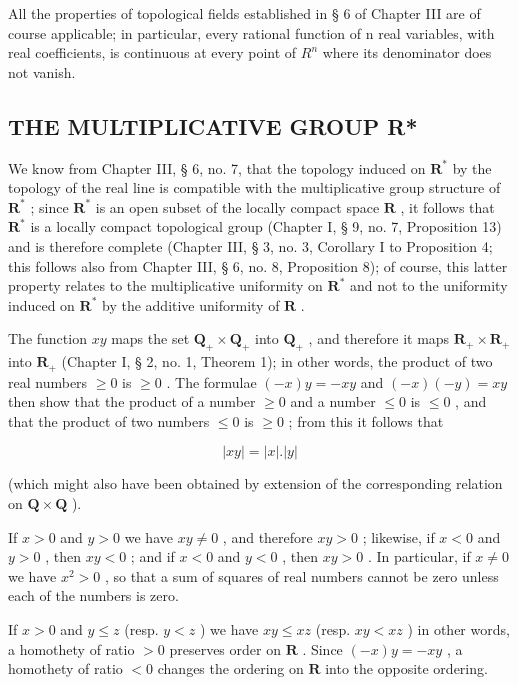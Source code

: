 All the properties of topological fields established in § 6 of Chapter III are of course applicable; in particular, every rational function of n real variables, with real coefficients, is continuous at every point of \(R^{n}\) where its denominator does not vanish.

\subsection{THE MULTIPLICATIVE GROUP R*}

We know from Chapter III, § 6, no. 7, that the topology induced on \(\mathbf{R}^*\) by the topology of the real line is compatible with the multiplicative group structure of \(\mathbf{R}^*\) ; since \(\mathbf{R}^*\) is an open subset of the locally compact space \(\mathbf{R}\) , it follows that \(\mathbf{R}^*\) is a locally compact topological group (Chapter I, § 9, no. 7, Proposition 13) and is therefore complete (Chapter III, § 3, no. 3, Corollary I to Proposition 4; this follows also from Chapter III, § 6, no. 8, Proposition 8); of course, this latter property relates to the multiplicative uniformity on \(\mathbf{R}^*\) and not to the uniformity induced on \(\mathbf{R}^*\) by the additive uniformity of \(\mathbf{R}\) .

The function \(xy\) maps the set \(\mathbf{Q}_{+} \times \mathbf{Q}_{+}\) into \(\mathbf{Q}_{+}\) , and therefore it maps \(\mathbf{R}_{+} \times \mathbf{R}_{+}\) into \(\mathbf{R}_{+}\) (Chapter I, § 2, no. 1, Theorem 1); in other words, the product of two real numbers \(\geqslant 0\) is \(\geqslant 0\) . The formulae \((-x)y = -xy\) and \((-x)(-y) = xy\) then show that the product of a number \(\geqslant 0\) and a number \(\leqslant 0\) is \(\leqslant 0\) , and that the product of two numbers \(\leqslant 0\) is \(\geqslant 0\) ; from this it follows that

\[
| x y | = | x |. | y |\tag{1}
\]

(which might also have been obtained by extension of the corresponding relation on \(\mathbf{Q} \times \mathbf{Q}\) ).

If \(x > 0\) and \(y > 0\) we have \(xy \neq 0\) , and therefore \(xy > 0\) ; likewise, if \(x < 0\) and \(y > 0\) , then \(xy < 0\) ; and if \(x < 0\) and \(y < 0\) , then \(xy > 0\) . In particular, if \(x \neq 0\) we have \(x^2 > 0\) , so that a sum of squares of real numbers cannot be zero unless each of the numbers is zero.

If \(x > 0\) and \(y \leqslant z\) (resp. \(y < z\) ) we have \(xy \leqslant xz\) (resp. \(xy < xz\) ) in other words, a homothety of ratio \(> 0\) preserves order on \(\mathbf{R}\) . Since \((-x)y = -xy\) , a homothety of ratio \(< 0\) changes the ordering on \(\mathbf{R}\) into the opposite ordering.


